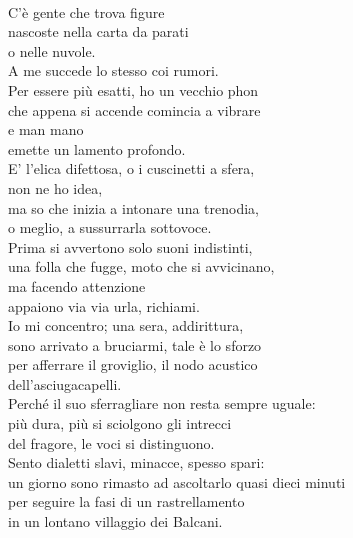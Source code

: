 
{}
\thispagestyle{empty}

~

\vfill

\begin{flushright}
C’è gente che trova figure \\
nascoste nella carta da parati \\
o nelle nuvole. \\
A me succede lo stesso coi rumori. \\
Per essere più esatti, ho un vecchio phon \\
che appena si accende comincia a vibrare \\
e man mano \\
emette un lamento profondo. \\
E’ l’elica difettosa, o i cuscinetti a sfera, \\
non ne ho idea, \\
ma so che inizia a intonare una trenodia, \\
o meglio, a sussurrarla sottovoce. \\
Prima si avvertono solo suoni indistinti, \\
una folla che fugge, moto che si avvicinano, \\
ma facendo attenzione \\
appaiono via via urla, richiami. \\
Io mi concentro; una sera, addirittura, \\
sono arrivato a bruciarmi, tale è lo sforzo \\
per afferrare il groviglio, il nodo acustico \\
dell’asciugacapelli. \\
Perché il suo sferragliare non resta sempre uguale: \\
più dura, più si sciolgono gli intrecci \\
del fragore, le voci si distinguono. \\
Sento dialetti slavi, minacce, spesso spari: \\
un giorno sono rimasto ad ascoltarlo quasi dieci minuti \\
per seguire la fasi di un rastrellamento \\
in un lontano villaggio dei Balcani. \\

\end{flushright}
